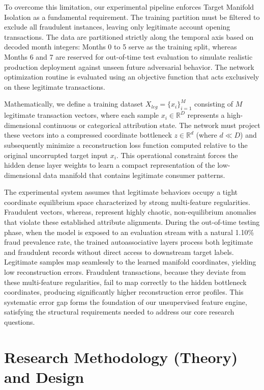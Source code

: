 \documentclass[11pt,a4paper]{report}
\begin{document}
To overcome this limitation, our experimental pipeline enforces Target Manifold Isolation as a fundamental requirement. The training partition must be filtered to exclude all fraudulent instances, leaving only legitimate account opening transactions. The data are partitioned strictly along the temporal axis based on decoded month integers: Months 0 to 5 serve as the training split, whereas Months 6 and 7 are reserved for out-of-time test evaluation to simulate realistic production deployment against unseen future adversarial behavior. The network optimization routine is evaluated using an objective function that acts exclusively on these legitimate transactions. 

Mathematically, we define a training dataset $X_{leg}=\{x_{i}\}_{i=1}^{M}$ consisting of $M$ legitimate transaction vectors, where each sample $x_{i}\in\mathbb{R}^{D}$ represents a high-dimensional continuous or categorical attribution state. The network must project these vectors into a compressed coordinate bottleneck $z\in\mathbb{R}^{d}$ (where $d\ll D$) and subsequently minimize a reconstruction loss function computed relative to the original uncorrupted target input $x_{i}$. This operational constraint forces the hidden dense layer weights to learn a compact representation of the low-dimensional data manifold that contains legitimate consumer patterns. 

The experimental system assumes that legitimate behaviors occupy a tight coordinate equilibrium space characterized by strong multi-feature regularities. Fraudulent vectors, whereas, represent highly chaotic, non-equilibrium anomalies that violate these established attribute alignments. During the out-of-time testing phase, when the model is exposed to an evaluation stream with a natural 1.10\% fraud prevalence rate, the trained autoassociative layers process both legitimate and fraudulent records without direct access to downstream target labels. Legitimate samples map seamlessly to the learned manifold coordinates, yielding low reconstruction errors. Fraudulent transactions, because they deviate from these multi-feature regularities, fail to map correctly to the hidden bottleneck coordinates, producing significantly higher reconstruction error profiles. This systematic error gap forms the foundation of our unsupervised feature engine, satisfying the structural requirements needed to address our core research questions.

\section{Research Methodology (Theory) and Design}
\end{document}
